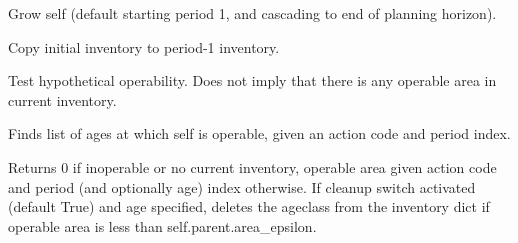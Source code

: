 \documentclass[letterpaper,10pt,english]{sphinxmanual}
\begin{document}
\begin{fulllineitems}
\begin{fulllineitems}
\end{fulllineitems}


\begin{fulllineitems}
\label{\detokenize{forest:forest.DevelopmentType.grow}}
Grow self (default starting period 1, and cascading to end of planning horizon).

\end{fulllineitems}


\begin{fulllineitems}
\label{\detokenize{forest:forest.DevelopmentType.initialize_areas}}
Copy initial inventory to period-1 inventory.

\end{fulllineitems}


\begin{fulllineitems}
\label{\detokenize{forest:forest.DevelopmentType.is_operable}}
Test hypothetical operability.
Does not imply that there is any operable area in current inventory.

\end{fulllineitems}


\begin{fulllineitems}
\label{\detokenize{forest:forest.DevelopmentType.operable_ages}}
Finds list of ages at which self is operable, given an action code and period index.

\end{fulllineitems}


\begin{fulllineitems}
\label{\detokenize{forest:forest.DevelopmentType.operable_area}}
Returns 0 if inoperable or no current inventory, operable area given action code and period 
(and optionally age) index otherwise. If cleanup switch activated (default True) and age specified, 
deletes the ageclass from the inventory dict if operable area is less than self.parent.area\_epsilon.


\end{fulllineitems}
\end{fulllineitems}
\end{document}
